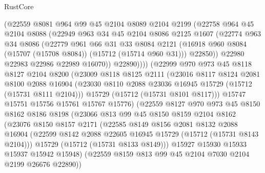 \begin{lexlean}{RustCore}
\begin{coremodule}
              (@22559
                @8081
                @964
                @99
                @45
                @2104
                @8089
                @2104
                @2199
                (@22758
                  @964
                  @45
                  @2104
                  @8088
                  (@22949
                    @963
                    @34
                    @45
                    @2104
                    @8086
                    @2125
                    @1607
                    (@22774
                      @963
                      @34
                      @8086
                      (@22779
                        @961
                        @66
                        @31
                        @33
                        @8084
                        @2121
                        (@16918 @960 @8084 (@15707 (@15708 @8084)) (@15712 (@15714 @960 @31)))
                        @22850))
                    @22980
                    @22983
                    @22986
                    @22989
                    @16070))
                @22890))))
        (@22999
          @970
          @973
          @45
          @8118
          @8127
          @2104
          @8200
          (@23009
            @8118
            @8125
            @2111
            (@23016
              @8117
              @8124
              @2081
              @8100
              @2088
              @16904
              (@23030 @8110 @2088 @23036 @16945 @15729 (@15712 (@15731 @8111 @2104)))
              @15729
              (@15712 (@15731 @8101 @8117)))
            @15747
            @15751
            @15756
            @15761
            @15767
            @15776)
          (@22559
            @8127
            @970
            @973
            @45
            @8150
            @8162
            @8186
            @8198
            (@23066
              @813
              @99
              @45
              @8150
              @8159
              @2104
              @8162
              (@23076
                @8150
                @8157
                @2171
                (@22585
                  @8149
                  @8156
                  @2081
                  @8132
                  @2088
                  @16904
                  (@22599 @8142 @2088 @22605 @16945 @15729 (@15712 (@15731 @8143 @2104)))
                  @15729
                  (@15712 (@15731 @8133 @8149)))
                @15927
                @15930
                @15933
                @15937
                @15942
                @15948)
              (@22559 @8159 @813 @99 @45 @2104 @7030 @2104 @2199 @26676 @22890))

\end{coremodule}
\end{lexlean}
